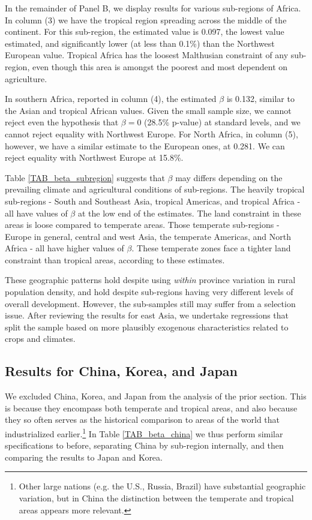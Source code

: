 \documentclass[11pt]{article}
\begin{document}
In the remainder of Panel B, we display results for various sub-regions of Africa. In column (3) we have the tropical region spreading across the middle of the continent. For this sub-region, the estimated value is 0.097, the lowest value estimated, and significantly lower (at less than 0.1\%) than the Northwest European value. Tropical Africa has the loosest Malthusian constraint of any sub-region, even though this area is amongst the poorest and most dependent on agriculture.

In southern Africa, reported in column (4), the estimated $\beta$ is 0.132, similar to the Asian and tropical African values. Given the small sample size, we cannot reject even the hypothesis that $\beta=0$ (28.5\% p-value) at standard levels, and we cannot reject equality with Northwest Europe. For North Africa, in column (5), however, we have a similar estimate to the European ones, at 0.281. We can reject equality with Northwest Europe at 15.8\%. 

Table \ref{TAB_beta_subregion} suggests that $\beta$ may differs depending on the prevailing climate and agricultural conditions of sub-regions. The heavily tropical sub-regions - South and Southeast Asia, tropical Americas, and tropical Africa - all have values of $\beta$ at the low end of the estimates. The land constraint in these areas is loose compared to temperate areas. Those temperate sub-regions - Europe in general, central and west Asia, the temperate Americas, and North Africa - all have higher values of $\beta$. These temperate zones face a tighter land constraint than tropical areas, according to these estimates.

These geographic patterns hold despite using \textit{within} province variation in rural population density, and hold despite sub-regions having very different levels of overall development. However, the sub-samples still may suffer from a selection issue. After reviewing the results for east Asia, we undertake regressions that split the sample based on more plausibly exogenous characteristics related to crops and climates.

\subsection{Results for China, Korea, and Japan}
We excluded China, Korea, and Japan from the analysis of the prior section. This is because they encompass both temperate and tropical areas, and also because they so often serves as the historical comparison to areas of the world that industrialized earlier.\footnote{Other large nations (e.g. the U.S., Russia, Brazil) have substantial geographic variation, but in China the distinction between the temperate and tropical areas appears more relevant.} In Table \ref{TAB_beta_china} we thus perform similar specifications to before, separating China by sub-region internally, and then comparing the results to Japan and Korea. 
\end{document}
